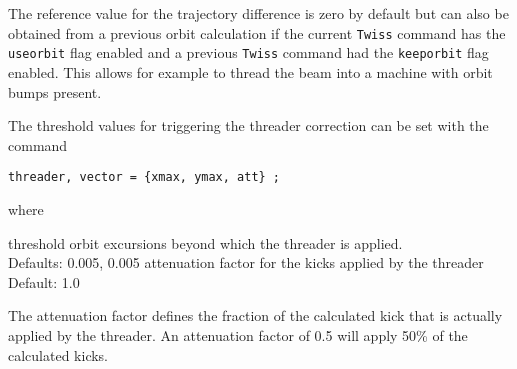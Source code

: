 The reference value for the trajectory difference is zero by default but
can also be obtained from a previous orbit calculation if the current
{\tt Twiss} command has the {\tt useorbit} flag enabled and a previous
{\tt Twiss} command had the {\tt keeporbit} flag enabled. This allows
for example to thread the beam into a machine with orbit bumps present.  

The threshold values for triggering the threader correction can be set
with the command  
\begin{verbatim}
threader, vector = {xmax, ymax, att} ;
\end{verbatim}  
where 
\begin{madlist}
 threshold orbit excursions beyond which the threader
is applied. \\ Defaults: 0.005, 0.005
 attenuation factor for the kicks applied by the threader
\\ Default: 1.0 
\end{madlist}

The attenuation factor defines the fraction of the calculated kick that
is actually applied by the threader.  
An attenuation factor of 0.5 will apply 50\% of the calculated kicks.

